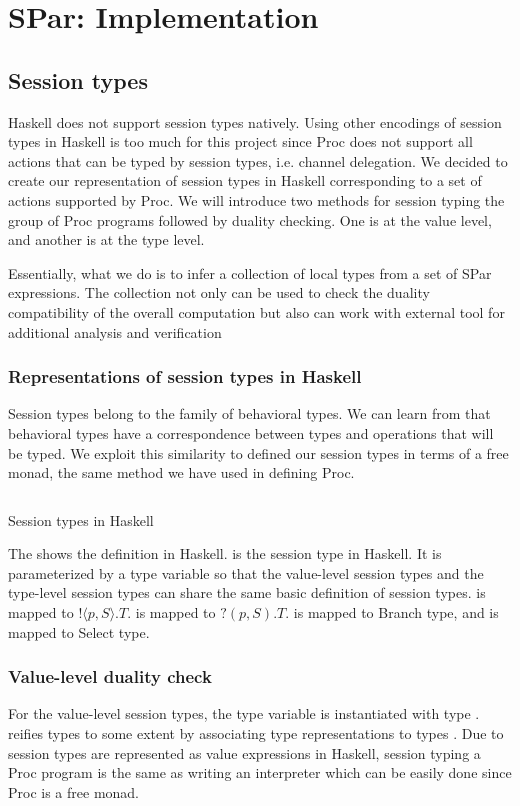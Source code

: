 \chapter{SPar: Implementation} \label{chap:impl}
\section{Session types} \label{impl:sec:session}
Haskell does not support session types natively. Using other encodings of session types in Haskell is too much for this project since Proc does not support all actions that can be typed by session types, i.e. channel delegation. We decided to create our representation of session types in Haskell corresponding to a set of actions supported by Proc. We will introduce two methods for session typing the group of Proc programs followed by duality checking. One is at the value level, and another is at the type level.

Essentially, what we do is to infer a collection of local types from a set of SPar expressions. The collection not only can be used to check the duality compatibility of the overall computation but also can work with external tool \cite{langeVerifyingAsynchronousInteractions2019} for additional analysis and verification
\subsection{Representations of session types in Haskell}
Session types belong to the family of behavioral types. We can learn from  that behavioral types have a correspondence between types and operations that will be typed. We exploit this similarity to defined our session types in terms of a free monad, the same method we have used in defining Proc.

\begin{listing}[ht]
    \inputminted{Haskell}{impl/type.hs}
    \caption{Session types in Haskell}
    \label{impl:code:type}
\end{listing}

The  shows the definition in Haskell.  is the session type in Haskell. It is parameterized by a type variable  so that the value-level session types and the type-level session types can share the same basic definition of session types.  is mapped to $! \langle p, S \rangle. T$.  is mapped to $?(p, S).T$.  is mapped to Branch type, and  is mapped to Select type.
\subsection{Value-level duality check}
For the value-level session types, the type variable  is instantiated with type .  reifies types to some extent by associating type representations to types \cite{DataTypeablea}. Due to session types are represented as value expressions in Haskell, session typing a Proc program is the same as writing an interpreter which can be easily done since Proc is a free monad. 


